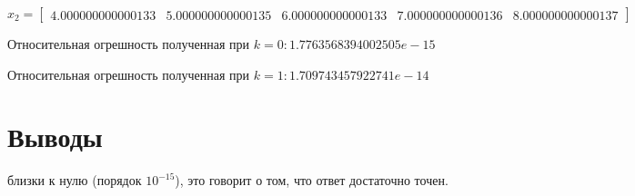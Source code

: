 \documentclass[12pt]{report}
\begin{document}
\vspace{0.5cm}\hspace{-2.6cm}$x_{2} = 
\begin{bmatrix}
     4.000000000000133 & 5.000000000000135 & 6.000000000000133 & 7.000000000000136 & 8.000000000000137
\end{bmatrix}
$

\vspace{0.5cm}Относительная огрешность полученная при $k = 0: 1.7763568394002505e-15$

Относительная огрешность полученная при $k = 1: 1.709743457922741e-14$

\section{Выводы}

 близки к нулю (порядок $10^{-15}$), это говорит о том, что ответ достаточно точен.
\end{document}
